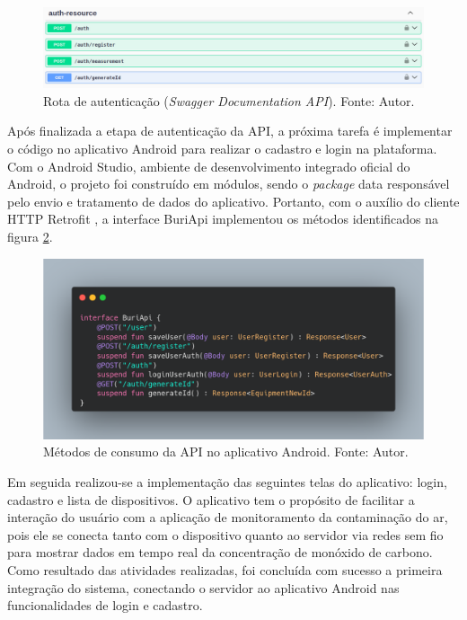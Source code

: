 \begin{figure}[ht]
    \centering
    \includegraphics[width=.74\textwidth]{img/swagger-auth-resource.png}
    \caption{Rota de autenticação (\textit{Swagger Documentation API}). Fonte: Autor.}\label{figSwaggerAut}
\end{figure}

Após finalizada a etapa de autenticação da API, a próxima tarefa é implementar o código no aplicativo Android 
para realizar o cadastro e login na plataforma. Com o Android Studio, ambiente de desenvolvimento integrado oficial do Android, o projeto 
foi construído em módulos, sendo o \textit{package} data responsável pelo envio e tratamento de dados do aplicativo. Portanto, com o auxílio do cliente HTTP Retrofit \cite{retrofit}, 
a interface BuriApi implementou os métodos identificados na figura \ref{figRetrofitAndroid}.

\begin{figure}[ht]
    \centering
    \includegraphics[width=.74\textwidth]{img/retrofit-buri-api-auth.png}
    \caption{Métodos de consumo da API no aplicativo Android. Fonte: Autor.}\label{figRetrofitAndroid}
\end{figure}

Em seguida realizou-se a implementação das seguintes telas do aplicativo: login, cadastro e lista de dispositivos. O aplicativo 
tem o propósito de facilitar a interação do usuário com a aplicação de monitoramento da contaminação do ar, pois ele se conecta 
tanto com o dispositivo quanto ao servidor via redes sem fio para mostrar dados em tempo real da concentração de monóxido de carbono. Como resultado das 
atividades realizadas, foi concluída com sucesso a primeira integração do sistema, conectando o servidor ao aplicativo Android nas 
funcionalidades de login e cadastro. 

